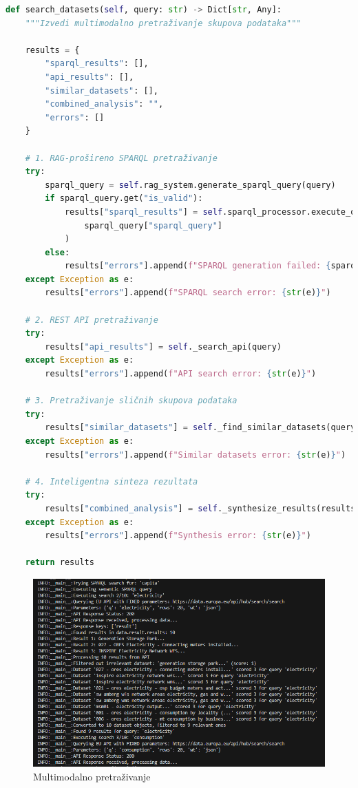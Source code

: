 \begin{lstlisting}[language=Python, caption=Implementacija multimodalnog pretraživanja]
def search_datasets(self, query: str) -> Dict[str, Any]:
    """Izvedi multimodalno pretraživanje skupova podataka"""
    
    results = {
        "sparql_results": [],
        "api_results": [],
        "similar_datasets": [],
        "combined_analysis": "",
        "errors": []
    }
    
    # 1. RAG-prošireno SPARQL pretraživanje
    try:
        sparql_query = self.rag_system.generate_sparql_query(query)
        if sparql_query.get("is_valid"):
            results["sparql_results"] = self.sparql_processor.execute_query(
                sparql_query["sparql_query"]
            )
        else:
            results["errors"].append(f"SPARQL generation failed: {sparql_query.get('errors')}")
    except Exception as e:
        results["errors"].append(f"SPARQL search error: {str(e)}")
    
    # 2. REST API pretraživanje
    try:
        results["api_results"] = self._search_api(query)
    except Exception as e:
        results["errors"].append(f"API search error: {str(e)}")
    
    # 3. Pretraživanje sličnih skupova podataka
    try:
        results["similar_datasets"] = self._find_similar_datasets(query)
    except Exception as e:
        results["errors"].append(f"Similar datasets error: {str(e)}")
    
    # 4. Inteligentna sinteza rezultata
    try:
        results["combined_analysis"] = self._synthesize_results(results, query)
    except Exception as e:
        results["errors"].append(f"Synthesis error: {str(e)}")
    
    return results
\end{lstlisting}

\begin{figure}[htbp]
    \centering
    \includegraphics[width=1\textwidth]{figures/2.png}
    \caption{Multimodalno pretraživanje}
    \label{fig:unified_data_assistant}
\end{figure}

